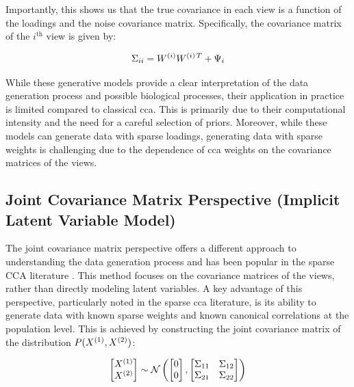 Importantly, this shows us that the true covariance in each view is a function of the \gls{loadings} and the noise covariance matrix.
Specifically, the covariance matrix of the $i^{\text{th}}$ view is given by:

\begin{align}
    \Sigma_{ii} = W^{(i)}W^{(i)\,T} + \Psi_i
\end{align}

While these generative models provide a clear interpretation of the data generation process and possible biological processes, their application in practice is limited compared to classical \acrshort{cca}.
This is primarily due to their computational intensity and the need for a careful selection of priors.
Moreover, while these models can generate data with sparse loadings, generating data with sparse weights is challenging due to the dependence of \acrshort{cca} weights on the covariance matrices of the views.

\subsection{Joint Covariance Matrix Perspective (Implicit Latent Variable Model)}

The joint covariance matrix perspective offers a different approach to understanding the data generation process and has been popular in the sparse CCA literature \citep{suo2017sparse,chen2013sparse}.
This method focuses on the covariance matrices of the views, rather than directly modeling latent variables.
A key advantage of this perspective, particularly noted in the sparse \acrshort{cca} literature, is its ability to generate data with known sparse weights and known canonical correlations at the population level.
This is achieved by constructing the joint covariance matrix of the distribution $P(X^{(1)},X^{(2)})$:

\begin{align}
    \label{eq:covariance}
    \begin{bmatrix}
        X^{(1)} \\ X^{(2)}
    \end{bmatrix} \sim \mathcal{N} \left( \begin{bmatrix}
                                              0 \\ 0
    \end{bmatrix}, \begin{bmatrix}
                       \Sigma_{11} & \Sigma_{12} \\ \Sigma_{21} & \Sigma_{22}
    \end{bmatrix} \right)
\end{align}

